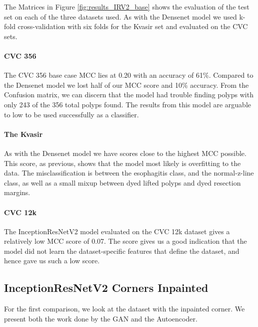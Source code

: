 \noindent
The Matrices in Figure \ref{fig:results_IRV2_base} shows the evaluation of the test set on each of the three datasets used. 
As with the Densenet model we used k-fold cross-validation with six folds for the Kvasir set and evaluated on the CVC sets.

\paragraph{CVC 356}
The CVC 356 base case MCC lies at 0.20 with an accuracy of 61\%.
Compared to the Densenet model we lost half of our MCC score and 10\% accuracy. 
From the Confusion matrix, we can discern that the model had trouble finding polyps with only 243 of the 356 total polyps found. The results from this model are arguable to low to be used successfully as a classifier.

\paragraph{The Kvasir}
As with the Densenet model we have scores close to the highest MCC possible. This score, as previous, shows that the model most likely is overfitting to the data. 
The misclassification is between the esophagitis class, and the normal-z-line class, as well as a small mixup between dyed lifted polyps and dyed resection margins. 


\paragraph{CVC 12k}
The InceptionResNetV2 model evaluated on the CVC 12k dataset gives a relatively low MCC score of 0.07. The score gives us a good indication that the model did not learn the dataset-specific features that define the dataset, and hence gave us such a low score.


\subsection{InceptionResNetV2 Corners Inpainted}
For the first comparison, we look at the dataset with the inpainted corner. We present both the work done by the GAN and the Autoencoder. 

